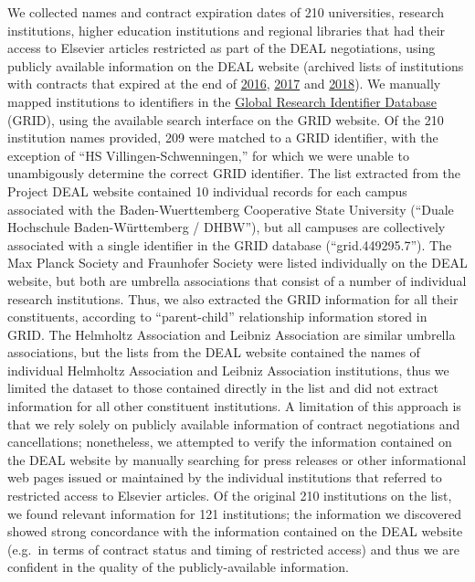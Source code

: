 \documentclass[
]{article}
\begin{document}
We collected names and contract expiration dates of 210 universities, research institutions, higher education institutions and regional libraries that had their access to Elsevier articles restricted as part of the DEAL negotiations, using publicly available information on the DEAL website (archived lists of institutions with contracts that expired at the end of \href{(https://web.archive.org/web/20191212094238/https://www.projekt-deal.de/vertragskuendigungen_elsevier/)}{2016}, \href{(https://web.archive.org/web/20191212094842/https://www.projekt-deal.de/vertragskundigungen-elsevier-2017/)}{2017} and \href{(https://web.archive.org/web/20191114074949/https://www.projekt-deal.de/vertragskundigungen-elsevier-2018/)}{2018}). We manually mapped institutions to identifiers in the \href{https://www.grid.ac/}{Global Research Identifier Database} (GRID), using the available search interface on the GRID website. Of the 210 institution names provided, 209 were matched to a GRID identifier, with the exception of ``HS Villingen-Schwenningen,'' for which we were unable to unambigously determine the correct GRID identifier. The list extracted from the Project DEAL website contained 10 individual records for each campus associated with the Baden-Wuerttemberg Cooperative State University (``Duale Hochschule Baden-Württemberg / DHBW''), but all campuses are collectively associated with a single identifier in the GRID database (``grid.449295.7''). The Max Planck Society and Fraunhofer Society were listed individually on the DEAL website, but both are umbrella associations that consist of a number of individual research institutions. Thus, we also extracted the GRID information for all their constituents, according to ``parent-child'' relationship information stored in GRID. The Helmholtz Association and Leibniz Association are similar umbrella associations, but the lists from the DEAL website contained the names of individual Helmholtz Association and Leibniz Association institutions, thus we limited the dataset to those contained directly in the list and did not extract information for all other constituent institutions. A limitation of this approach is that we rely solely on publicly available information of contract negotiations and cancellations; nonetheless, we attempted to verify the information contained on the DEAL website by manually searching for press releases or other informational web pages issued or maintained by the individual institutions that referred to restricted access to Elsevier articles. Of the original 210 institutions on the list, we found relevant information for 121 institutions; the information we discovered showed strong concordance with the information contained on the DEAL website (e.g.~in terms of contract status and timing of restricted access) and thus we are confident in the quality of the publicly-available information.
\end{document}
